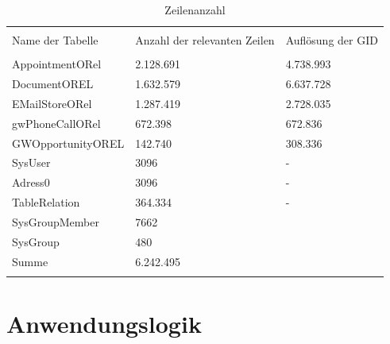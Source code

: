 \begin{table}[htbp]
\centering
\label{tb_zeilenanzahl}
\begin{tabularx}{\textwidth} {X X X}
& & \\
Name der Tabelle &  Anzahl der relevanten Zeilen & Auflösung der GID\\
& & \\
AppointmentORel & 2.128.691 & 4.738.993 \\
DocumentOREL & 1.632.579 & 6.637.728 \\
EMailStoreORel & 1.287.419 & 2.728.035 \\
gwPhoneCallORel & 672.398 & 672.836 \\
GWOpportunityOREL & 142.740 & 308.336 \\
SysUser & 3096 & - \\
Adress0 & 3096 & - \\
TableRelation & 364.334 & - \\
SysGroupMember & 7662 & \\
SysGroup & 480 & \\
\midrule
Summe & 6.242.495 \\
& & \\
\end{tabularx}
\caption{Zeilenanzahl}
\end{table}

\section{Anwendungslogik}

